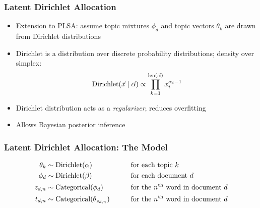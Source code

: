 \begin{frame}
\frametitle{Latent Dirichlet Allocation}
\begin{itemize}[<+->]
\item Extension to PLSA: assume topic mixtures $\phi_d$ and topic vectors $\theta_k$ are drawn from Dirichlet distributions
\item Dirichlet is a distribution over discrete probability distributions; density over simplex:
\[ \text{Dirichlet}(\vec x \mid \vec \alpha) \propto \prod_{k=1}^{\mathop{\text{len}}(\vec\alpha)} x_i^{\alpha_i - 1} \]
\item Dirichlet distribution acts as a \emph{regularizer}, reduces overfitting
\item Allows Bayesian posterior inference
\end{itemize}
\end{frame}

\begin{frame}
\frametitle{Latent Dirichlet Allocation: The Model}
\begin{alignat*}{2}
\theta_k &\sim \text{Dirichlet}(\alpha) &\qquad&\text{for each topic $k$} \\
\phi_d &\sim \text{Dirichlet}(\beta) &\qquad&\text{for each document $d$} \\
z_{d,n} &\sim \text{Categorical}(\phi_d) &\qquad&\text{for the $n^{\text{th}}$ word in document $d$} \\
t_{d,n} &\sim \text{Categorical}(\theta_{z_{d,n}}) &\qquad&\text{for the $n^{\text{th}}$ word in document $d$}
\end{alignat*}

\begin{center}
\end{center}
\end{frame}


